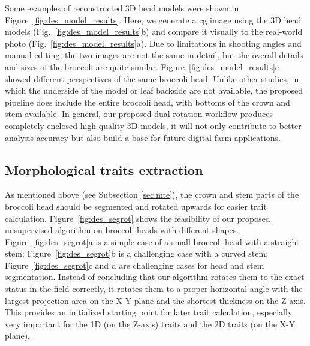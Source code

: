 

Some examples of reconstructed 3D head models were shown in Figure~\ref{fig:des_model_results}. Here, we generate a \gls{cg} image using the 3D head models (Fig.~\ref{fig:des_model_results}b) and compare it visually to the real-world photo (Fig.~\ref{fig:des_model_results}a). Due to limitations in shooting angles and manual editing, the two images are not the same in detail, but the overall details and sizes of the broccoli are quite similar. Figure~\ref{fig:des_model_results}c showed different perspectives of the same broccoli head. Unlike other studies, in which the underside of the model \citep{kochi_3d_2018} or leaf backside \citep{cao_quantifying_2019} are not available, the proposed pipeline does include the entire broccoli head, with bottoms of the crown and stem available. In general, our proposed dual-rotation workflow produces completely enclosed high-quality 3D models, it will not only contribute to better analysis accuracy but also build a base for future digital farm applications.



\subsection{Morphological traits extraction}

As mentioned above (see Subsection \ref{sec:mte}), the crown and stem parts of the broccoli head should be segmented and rotated upwards for easier trait calculation. Figure~\ref{fig:des_segrot} shows the feasibility of our proposed unsupervised algorithm on broccoli heads with different shapes. Figure~\ref{fig:des_segrot}a is a simple case of a small broccoli head with a straight stem; Figure~\ref{fig:des_segrot}b is a challenging case with a curved stem;  Figure~\ref{fig:des_segrot}c and d are challenging cases for head and stem segmentation. Instead of concluding that our algorithm rotates them to the exact status in the field correctly, it rotates them to a proper horizontal angle with the largest projection area on the X-Y plane and the shortest thickness on the Z-axis. This provides an initialized starting point for later trait calculation, especially very important for the 1D (on the Z-axis) traits and the 2D traits (on the X-Y plane).



